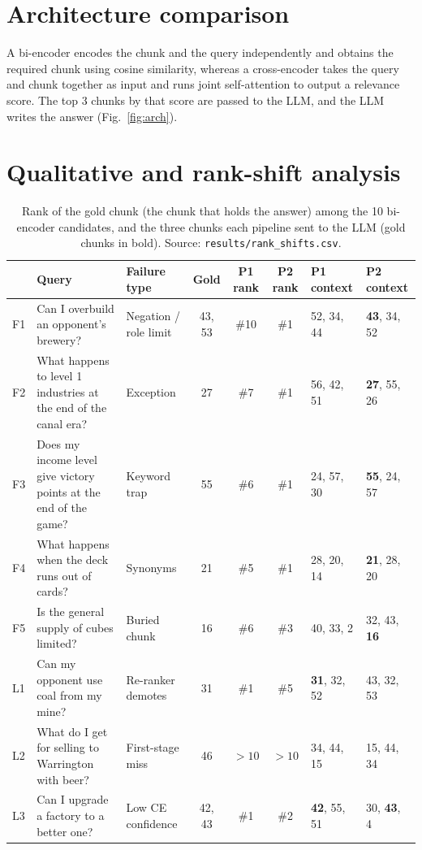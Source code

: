 \documentclass[10pt,a4paper]{article}
\newcommand{\gold}[1]{\textbf{#1}}                 %
\begin{document}
\section{Architecture comparison}

A bi-encoder encodes the chunk and the query independently and obtains the required chunk using cosine
similarity, whereas a cross-encoder takes the query and chunk together as input and runs joint self-attention
to output a relevance score. The top 3 chunks by that score are passed to the LLM, and the LLM writes the
answer (Fig.~\ref{fig:arch}).

\section{Qualitative and rank-shift analysis}

\begin{table}[H]
\centering\footnotesize
\caption{Rank of the gold chunk (the chunk that holds the answer) among the 10 bi-encoder candidates, and the
three chunks each pipeline sent to the LLM (gold chunks in bold). Source: \texttt{results/rank\_shifts.csv}.}
\label{tab:ranks}
\begin{tabularx}{\textwidth}{@{}l>{\raggedright\arraybackslash}Xl c c c l l@{}}
\toprule
 & Query & Failure type & Gold & P1 rank & P2 rank & P1 context & P2 context \\
\midrule
F1 & Can I overbuild an opponent's brewery? & Negation / role limit & 43, 53 & \#10 & \#1 & 52, 34, 44 & \gold{43}, 34, 52 \\
F2 & What happens to level 1 industries at the end of the canal era? & Exception & 27 & \#7 & \#1 & 56, 42, 51 & \gold{27}, 55, 26 \\
F3 & Does my income level give victory points at the end of the game? & Keyword trap & 55 & \#6 & \#1 & 24, 57, 30 & \gold{55}, 24, 57 \\
F4 & What happens when the deck runs out of cards? & Synonyms & 21 & \#5 & \#1 & 28, 20, 14 & \gold{21}, 28, 20 \\
F5 & Is the general supply of cubes limited? & Buried chunk & 16 & \#6 & \#3 & 40, 33, 2 & 32, 43, \gold{16} \\
\midrule
L1 & Can my opponent use coal from my mine? & Re-ranker demotes & 31 & \#1 & \#5 & \gold{31}, 32, 52 & 43, 32, 53 \\
L2 & What do I get for selling to Warrington with beer? & First-stage miss & 46 & ${>}10$ & ${>}10$ & 34, 44, 15 & 15, 44, 34 \\
L3 & Can I upgrade a factory to a better one? & Low CE confidence & 42, 43 & \#1 & \#2 & \gold{42}, 55, 51 & 30, \gold{43}, 4 \\
\bottomrule
\end{tabularx}
\end{table}
\end{document}
